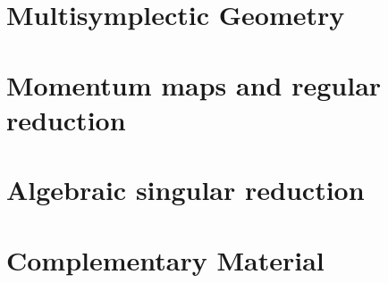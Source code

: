 \documentclass[handout,10pt]{beamer}
\begin{document}
\section{Multisymplectic Geometry}
\checkpoint	
	

\section{Momentum maps and regular reduction}
\checkpoint	
	

\section{Algebraic singular reduction}
\checkpoint	
	






\appendix
\section{Complementary Material}
	
	
	










\end{document}
